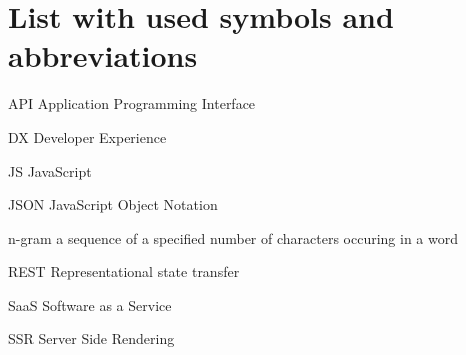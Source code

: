 
\chapter*{List with used symbols and abbreviations}

\begin{abbreviations}
\item[API] Application Programming Interface
\item[DX] Developer Experience
\item[JS] JavaScript
\item[JSON] JavaScript Object Notation
\item[n-gram] a sequence of a specified number of characters occuring in a word\cite{kimbrell1988searching}
\item[REST] Representational state transfer\cite{fielding2000architectural}
\item[SaaS] Software as a Service
\item[SSR] Server Side Rendering
\end{abbreviations}
